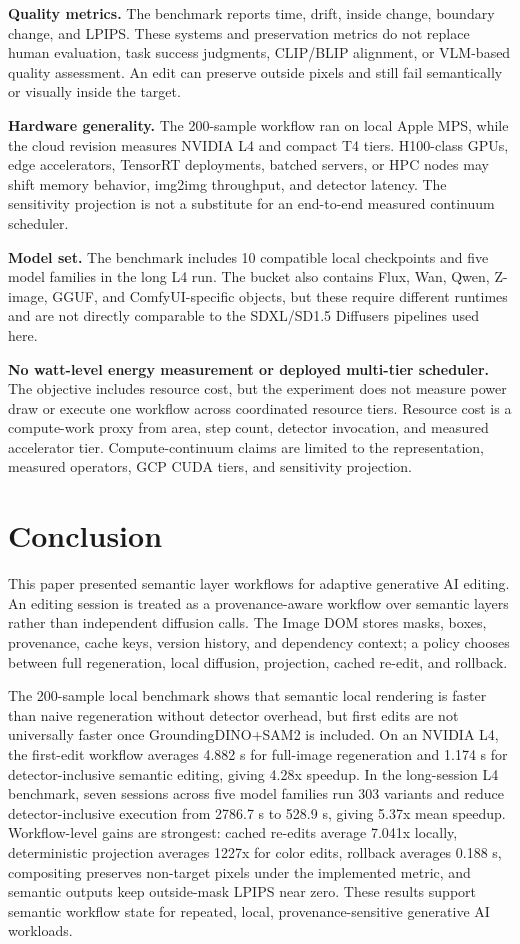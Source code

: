 \documentclass[final,5p,times,number,sort&compress]{elsarticle}
\newcommand{\imageDOM}{Image DOM}
\begin{document}
\textbf{Quality metrics.} The benchmark reports time, drift, inside change, boundary change, and LPIPS. These systems and preservation metrics do not replace human evaluation, task success judgments, CLIP/BLIP alignment, or VLM-based quality assessment. An edit can preserve outside pixels and still fail semantically or visually inside the target.

\textbf{Hardware generality.} The 200-sample workflow ran on local Apple MPS, while the cloud revision measures NVIDIA L4 and compact T4 tiers. H100-class GPUs, edge accelerators, TensorRT deployments, batched servers, or HPC nodes may shift memory behavior, img2img throughput, and detector latency. The sensitivity projection is not a substitute for an end-to-end measured continuum scheduler.

\textbf{Model set.} The benchmark includes 10 compatible local checkpoints and five model families in the long L4 run. The bucket also contains Flux, Wan, Qwen, Z-image, GGUF, and ComfyUI-specific objects, but these require different runtimes and are not directly comparable to the SDXL/SD1.5 Diffusers pipelines used here.

\textbf{No watt-level energy measurement or deployed multi-tier scheduler.} The objective includes resource cost, but the experiment does not measure power draw or execute one workflow across coordinated resource tiers. Resource cost is a compute-work proxy from area, step count, detector invocation, and measured accelerator tier. Compute-continuum claims are limited to the representation, measured operators, GCP CUDA tiers, and sensitivity projection.

\section{Conclusion}

This paper presented semantic layer workflows for adaptive generative AI editing. An editing session is treated as a provenance-aware workflow over semantic layers rather than independent diffusion calls. The \imageDOM{} stores masks, boxes, provenance, cache keys, version history, and dependency context; a policy chooses between full regeneration, local diffusion, projection, cached re-edit, and rollback.

The 200-sample local benchmark shows that semantic local rendering is faster than naive regeneration without detector overhead, but first edits are not universally faster once GroundingDINO+SAM2 is included. On an NVIDIA L4, the first-edit workflow averages 4.882 s for full-image regeneration and 1.174 s for detector-inclusive semantic editing, giving 4.28x speedup. In the long-session L4 benchmark, seven sessions across five model families run 303 variants and reduce detector-inclusive execution from 2786.7 s to 528.9 s, giving 5.37x mean speedup. Workflow-level gains are strongest: cached re-edits average 7.041x locally, deterministic projection averages 1227x for color edits, rollback averages 0.188 s, compositing preserves non-target pixels under the implemented metric, and semantic outputs keep outside-mask LPIPS near zero. These results support semantic workflow state for repeated, local, provenance-sensitive generative AI workloads.
\end{document}
